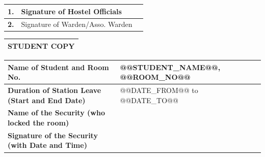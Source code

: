 \documentclass[a4paper,9pt]{article}
\newcommand{\tablejoin}{\vspace{-\arrayrulewidth}\noindent}
\begin{document}
\tablejoin
\begin{tabularx}{\linewidth}{|C{0.65cm}|L{6.8cm}|X|}
\hline
\textbf{1.} & Signature of Hostel Officials    & \vspace{7mm} \\
\hline
\textbf{2.} & Signature of Warden/Asso. Warden & \vspace{7mm} \\
\hline
\end{tabularx}

\vspace{3mm}

\noindent{\large\Cutright}\hspace{1mm}%
{\hdashrule[0.5ex]{\dimexpr\linewidth-14pt\relax}{0.6pt}{5pt 3pt}}

\vspace{2mm}

\noindent
\begin{tabularx}{\linewidth}{|X|}
\hline
\textbf{STUDENT COPY} \\
\hline
\end{tabularx}

\tablejoin
\begin{tabularx}{\linewidth}{|L{8.2cm}|X|}
\hline
\textbf{Name of Student and Room No.}                   & @@STUDENT_NAME@@, @@ROOM_NO@@ \\
\hline
\textbf{Duration of Station Leave (Start and End Date)} & @@DATE_FROM@@ to @@DATE_TO@@ \\
\hline
\textbf{Name of the Security (who locked the room)}     & \\
\hline
\textbf{Signature of the Security (with Date and Time)} & \vspace{6mm} \\
\hline
\end{tabularx}
\end{document}
